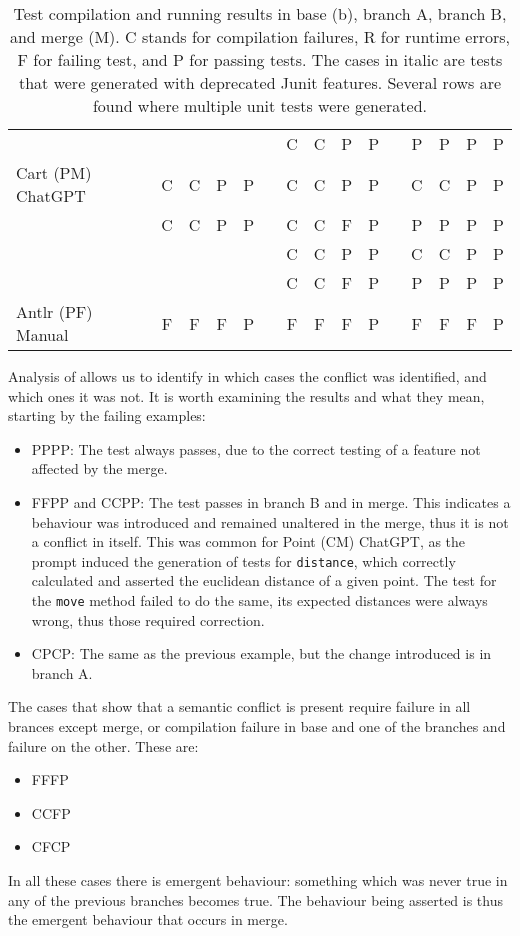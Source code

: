 \begin{table}[t]
\begin{tabular}{@{\extracolsep{\fill}} llcccccccccccccc}
                            & &   &   &   &   & & C & C & P & P & & P & P & P & P \\
Cart (PM) ChatGPT           & & C & C & P & P & & C & C & P & P & & C & C & P & P \\
                            & & C & C & P & P & & C & C & F & P & & P & P & P & P \\
                            & &   &   &   &   & & C & C & P & P & & C & C & P & P \\
                            & &   &   &   &   & & C & C & F & P & & P & P & P & P \\
Antlr (PF) Manual           & & F & F & F & P & & F & F & F & P & & F & F & F & P \\
        \bottomrule
    \end{tabular}
    \caption{Test compilation and running results in base (b), branch A,
    branch B, and merge (M).  C stands for compilation failures, R for runtime errors,
    F for failing test, and P for passing tests. The cases in italic are tests that were generated with deprecated Junit features.
    Several rows are found where multiple unit tests were generated.
    \label{tab:results:rq2tests}}
\end{table}


Analysis of  allows us to identify in which cases the conflict was identified, and which ones it was not.
It is worth examining the results and what they mean, starting by the failing examples:
%
\begin{itemize}
  \item PPPP: The test always passes, due to the correct testing of a feature not affected by the merge.

  \item FFPP and CCPP: The test passes in branch B and in merge. This indicates a behaviour was introduced and remained unaltered in the merge, thus it is not a conflict in itself.
  This was common for Point (CM) ChatGPT, as the prompt induced the generation of tests for \texttt{distance}, which correctly calculated and asserted the euclidean distance of a given point.  The test for the \texttt{move} method failed to do the same, its expected distances were always wrong, thus those required correction.

  \item CPCP: The same as the previous example, but the change introduced is in branch A.
\end{itemize}
%
The cases that show that a semantic conflict is present require failure in all brances except merge, or compilation failure in base and one of the branches and failure on the other.
These are:
\begin{itemize}
  \item FFFP
  \item CCFP
  \item CFCP
\end{itemize}
%
In all these cases there is emergent behaviour: something which was never true in any of the previous branches becomes true. The behaviour being asserted is thus the
emergent behaviour that occurs in merge.

